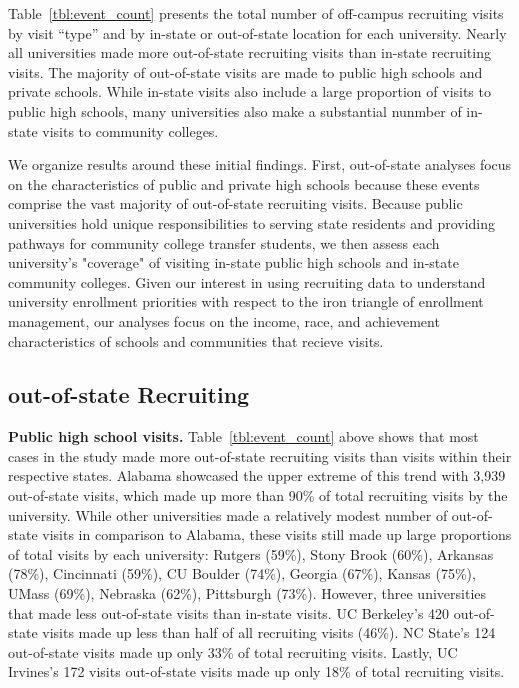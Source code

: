 \documentclass[twoside]{article}
\begin{document}

Table~\ref{tbl:event_count} presents the total number of off-campus recruiting visits by visit ``type'' and by in-state or out-of-state location for each university. Nearly all universities made more out-of-state recruiting visits than in-state recruiting visits. The majority of out-of-state visits are made to public high schools and private schools. While in-state visits also include a large proportion of visits to public high schools, many universities also make a substantial nunmber of in-state visits to community colleges.

We organize results around these initial findings. First, out-of-state analyses focus on the characteristics of public and private high schools because these events comprise the vast majority of out-of-state recruiting visits. Because public universities hold unique responsibilities to serving state residents and providing pathways for community college transfer students, we then assess each university's "coverage" of visiting in-state public high schools and in-state community colleges. Given our interest in using recruiting data to understand university enrollment priorities with respect to the iron triangle of enrollment management, our analyses focus on the income, race, and achievement characteristics of schools and communities that recieve visits.

\subsection*{out-of-state Recruiting}

\textbf{Public high school visits.} Table~\ref{tbl:event_count} above shows that most cases in the study made more out-of-state recruiting visits than visits within their respective states. Alabama showcased the upper extreme of this trend with 3,939 out-of-state visits, which made up more than 90\% of total recruiting visits by the university. While other universities made a relatively modest number of out-of-state visits in comparison to Alabama, these visits still made up large proportions of total visits by each university: Rutgers (59\%), Stony Brook (60\%), Arkansas (78\%), Cincinnati (59\%), CU Boulder (74\%), Georgia (67\%), Kansas (75\%), UMass (69\%), Nebraska (62\%), Pittsburgh (73\%). However, three universities that made less out-of-state visits than in-state visits. UC Berkeley's 420 out-of-state visits made up less than half of all recruiting visits (46\%). NC State's 124 out-of-state visits made up only 33\% of total recruiting visits. Lastly, UC Irvines's 172 visits out-of-state visits made up only 18\% of total recruiting visits.
\end{document}
